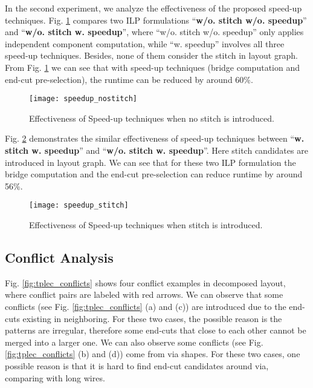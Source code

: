 \documentclass[12pt]{spieman}
\theoremstyle{plain}
\begin{document}
\begin{spacing}{1}
In the second experiment, we analyze the effectiveness of the proposed speed-up techniques.
Fig. \ref{fig:tplec_speedup_nostitch} compares two ILP formulations ``\textbf{w/o. stitch w/o. speedup}'' and ``\textbf{w/o. stitch w. speedup}'',
where ``w/o. stitch w/o. speedup'' only applies independent component computation, while ``w. speedup'' involves all three speed-up techniques.
Besides, none of them consider the stitch in layout graph.
From Fig. \ref{fig:tplec_speedup_nostitch} we can see that with speed-up techniques (bridge computation and end-cut pre-selection), the runtime can be reduced by around 60\%.

\begin{figure}[htb]
  \centering
  \texttt{[image: speedup\_nostitch]}
  \caption{Effectiveness of Speed-up techniques when no stitch is introduced.}
  \label{fig:tplec_speedup_nostitch}
\end{figure}

Fig. \ref{fig:tplec_speedup_stitch} demonstrates the similar effectiveness of speed-up techniques between ``\textbf{w. stitch w. speedup}'' and ``\textbf{w/o. stitch w. speedup}''.
Here stitch candidates are introduced in layout graph.
We can see that for these two ILP formulation the bridge computation and the end-cut pre-selection can reduce runtime by around 56\%.

\begin{figure}[htb]
  \centering
  \texttt{[image: speedup\_stitch]}
  \caption{Effectiveness of Speed-up techniques when stitch is introduced.}
  \label{fig:tplec_speedup_stitch}
\end{figure}


\subsection{Conflict Analysis}

Fig. \ref{fig:tplec_conflicts} shows four conflict examples in decomposed layout, where conflict pairs are labeled with red arrows.
We can observe that some conflicts (see Fig. \ref{fig:tplec_conflicts} (a) and (c)) are introduced due to the end-cuts existing in neighboring.
For these two cases, the possible reason is the patterns are irregular, therefore some end-cuts that close to each other cannot be merged into a larger one.
We can also observe some conflicts (see Fig. \ref{fig:tplec_conflicts} (b) and (d)) come from via shapes.
For these two cases, one possible reason is that it is hard to find end-cut candidates around via, comparing with long wires.


\end{spacing}
\end{document}

